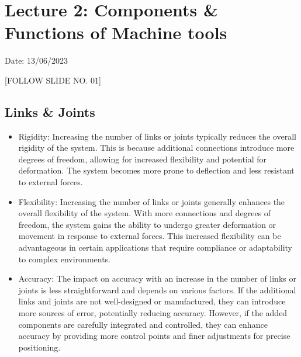 \documentclass{article}
\begin{document}
\newpage

\section{Lecture 2: Components \& Functions of Machine tools}
\hfill Date: 13/06/2023

[FOLLOW SLIDE NO. 01]

\subsection*{Links \& Joints}
\begin{itemize}
  \item Rigidity: Increasing the number of links or joints typically reduces the overall rigidity of the system. This is because additional connections introduce more degrees of freedom, allowing for increased flexibility and potential for deformation. The system becomes more prone to deflection and less resistant to external forces.
  \item Flexibility: Increasing the number of links or joints generally enhances the overall flexibility of the system. With more connections and degrees of freedom, the system gains the ability to undergo greater deformation or movement in response to external forces. This increased flexibility can be advantageous in certain applications that require compliance or adaptability to complex environments.
  \item Accuracy: The impact on accuracy with an increase in the number of links or joints is less straightforward and depends on various factors. If the additional links and joints are not well-designed or manufactured, they can introduce more sources of error, potentially reducing accuracy. However, if the added components are carefully integrated and controlled, they can enhance accuracy by providing more control points and finer adjustments for precise positioning.
\end{itemize}
\end{document}
